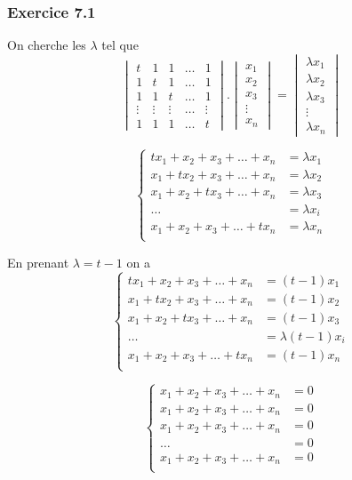 \documentclass[]{book}
\theoremstyle{definition}
\begin{document}
\subsubsection*{Exercice 7.1}
On cherche les $\lambda$ tel que
$$ \begin{vmatrix} t & 1 & 1 & \ldots & 1 \\ 1 & t & 1 & \ldots & 1 \\ 1 & 1 & t & \ldots & 1 \\ \vdots & \vdots & \vdots & \ldots & \vdots \\ 1 & 1 & 1 & \ldots & t \end{vmatrix} . \begin{vmatrix} x_1 \\ x_2 \\ x_3 \\ \vdots \\ x_n \end{vmatrix} = \begin{vmatrix} \lambda x_1 \\ \lambda x_2 \\ \lambda x_3 \\ \vdots \\ \lambda x_n \end{vmatrix}$$

$$
\left\{
\begin{array}{ll}
tx_1 + x_2 + x_3 + \ldots + x_n & = \lambda x_1 \\
x_1 + tx_2 + x_3 + \ldots + x_n & = \lambda x_2 \\
x_1 + x_2 + tx_3 + \ldots + x_n & = \lambda x_3 \\
\ldots  & = \lambda x_i \\
x_1 + x_2 + x_3 + \ldots + tx_n & = \lambda x_n \\
\end{array}
\right.
$$

En prenant $\lambda = t-1$ on a 
$$
\left\{
\begin{array}{ll}
tx_1 + x_2 + x_3 + \ldots + x_n & = (t-1) x_1 \\
x_1 + tx_2 + x_3 + \ldots + x_n & = (t-1) x_2 \\
x_1 + x_2 + tx_3 + \ldots + x_n & = (t-1) x_3 \\
\ldots  & = \lambda (t-1)x_i \\
x_1 + x_2 + x_3 + \ldots + tx_n & = (t-1) x_n \\
\end{array}
\right.
$$

$$
\left\{
\begin{array}{ll}
x_1 + x_2 + x_3 + \ldots + x_n & = 0 \\
x_1 + x_2 + x_3 + \ldots + x_n & = 0 \\
x_1 + x_2 + x_3 + \ldots + x_n & = 0 \\
\ldots  & = 0 \\
x_1 + x_2 + x_3 + \ldots + x_n & = 0 \\
\end{array}
\right.
$$
\end{document}

